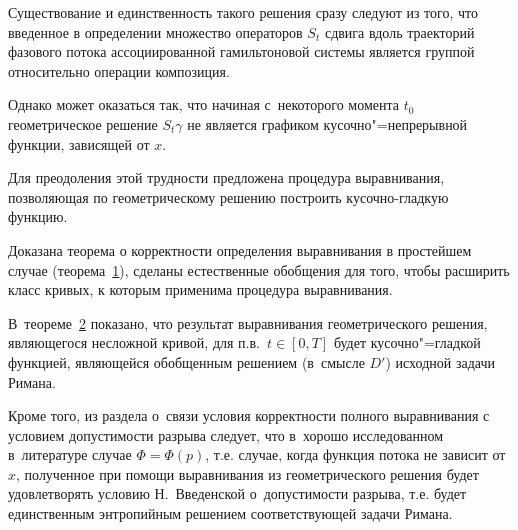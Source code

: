 Существование и единственность такого решения сразу следуют из того, что введенное в определении множество операторов $S_t$ сдвига вдоль траекторий фазового потока ассоциированной гамильтоновой системы является группой относительно операции композиция. 



Однако может оказаться так, что начиная с~некоторого момента $t_0$ геометрическое решение $S_t\gamma$ не является графиком кусочно"=непрерывной функции, зависящей от $x$. 

Для преодоления этой трудности предложена процедура выравнивания, позволяющая по геометрическому решению построить кусочно-гладкую функцию. 



Доказана теорема о корректности определения выравнивания в простейшем случае (теорема~\hyperlink{newth}{1}), сделаны естественные обобщения для того, чтобы расширить класс кривых, к которым применима процедура выравнивания. 



В~теореме~\hyperlink{newthm2}{2}  показано, что результат выравнивания геометрического решения, являющегося несложной кривой, для п.в.~$t\in[0,T]$ будет кусочно"=гладкой функцией, являющейся обобщенным решением (в~смысле $D'$) исходной задачи Римана. 



Кроме того, из раздела о~связи условия корректности полного выравнивания с условием допустимости разрыва следует, что в~хорошо исследованном в~литературе случае $\Phi=\Phi(p)$, т.е. случае, когда функция потока не зависит от $x$, полученное при помощи выравнивания из геометрического решения будет удовлетворять условию Н.~Введенской о~допустимости разрыва, т.е. будет единственным энтропийным решением соответствующей задачи Римана.



\bigskip










